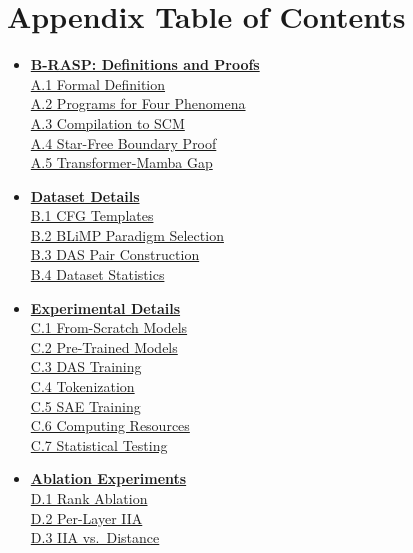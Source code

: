 \documentclass[11pt]{article}
\begin{document}
\section*{Appendix Table of Contents}
\vspace{-3pt}
{\small\setlength{\leftmargini}{1.8em}
\begin{itemize}[itemsep=4pt,topsep=2pt,leftmargin=*]
\item[\textbf{A}] \hyperref[app:brasp]{\textbf{B-RASP: Definitions and Proofs}}\\[1pt]
  \hyperref[app:brasp-def]{A.1 Formal Definition}\\
  \hyperref[app:programs]{A.2 Programs for Four Phenomena}\\
  \hyperref[app:compile]{A.3 Compilation to SCM}\\
  \hyperref[app:star-free-proof]{A.4 Star-Free Boundary Proof}\\
  \hyperref[app:succinctness-proof]{A.5 Transformer-Mamba Gap}
\item[\textbf{B}] \hyperref[app:data]{\textbf{Dataset Details}}\\[1pt]
  \hyperref[app:cfg]{B.1 CFG Templates}\\
  \hyperref[app:blimp]{B.2 BLiMP Paradigm Selection}\\
  \hyperref[app:das-pairs]{B.3 DAS Pair Construction}\\
  \hyperref[app:data-stats]{B.4 Dataset Statistics}
\item[\textbf{C}] \hyperref[app:exp]{\textbf{Experimental Details}}\\[1pt]
  \hyperref[app:from-scratch]{C.1 From-Scratch Models}\\
  \hyperref[app:pretrained]{C.2 Pre-Trained Models}\\
  \hyperref[app:das-details]{C.3 DAS Training}\\
  \hyperref[app:tokenization]{C.4 Tokenization}\\
  \hyperref[app:sae-details]{C.5 SAE Training}\\
  \hyperref[app:compute]{C.6 Computing Resources}\\
  \hyperref[app:stats]{C.7 Statistical Testing}
\item[\textbf{D}] \hyperref[app:ablation]{\textbf{Ablation Experiments}}\\[1pt]
  \hyperref[app:rank]{D.1 Rank Ablation}\\
  \hyperref[app:perlayer-all]{D.2 Per-Layer IIA}\\
  \hyperref[app:iia-distance]{D.3 IIA vs.\ Distance}\\

\end{itemize}}
\end{document}
